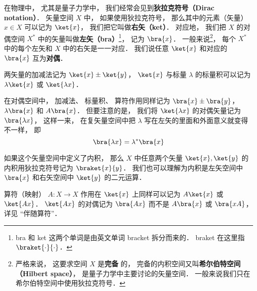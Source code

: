 

在物理中， 尤其是量子力学中， 我们经常会见到\textbf{狄拉克符号（Dirac notation）}． 矢量空间 $X$ 中， 如果使用狄拉克符号， 那么其中的元素（矢量） $x\in X$ 可以记为 $\ket{x}$， 我们把它叫做\textbf{右矢（ket）}． 对应地， 我们把 $X$ 的对偶空间 $X^*$ 中的矢量叫做\textbf{左矢（bra）}\footnote{bra 和 ket 这两个单词是由英文单词 bracket 拆分而来的． braket 在这里指 $\braket{\cdot}{\cdot}$．}， 记为 $\bra{x}$． 一般来说\footnote{严格来说， 这要求空间 $X$ 是\textbf{完备}%
的， 完备的内积空间又叫\textbf{希尔伯特空间（Hilbert space）}， 是量子力学中主要讨论的矢量空间． 一般来说我们只在希尔伯特空间中使用狄拉克符号．}， 每个 $X^*$ 中的每个左矢和 $X$ 中的右矢是一一对应． 我们说任意 $\ket{x}$ 和对应的 $\bra{x}$ 互为\textbf{对偶}．

两矢量的加减法记为 $\ket{x} \pm \ket{y}$， $\ket{x}$ 与标量 $\lambda$ 的标量积可以记为 $\lambda\ket{x}$ 或 $\ket{\lambda x}$．

在对偶空间中， 加减法、 标量积、 算符作用同样记为 $\bra{x} \pm \bra{y}$， $\lambda\bra{x}$ 和 $A\bra{x}$． 但要注意的是， 我们将 $\ket{\lambda x}$ 的对偶矢量记为 $\bra{\lambda x}$， 这样一来， 在复矢量空间中把 $\lambda$ 写在左矢的里面和外面意义就变得不一样， 即 %
\begin{equation}
\bra{\lambda x} = \lambda^* \bra{x}
\end{equation}

如果这个矢量空间中定义了内积， 那么 $X$ 中任意两个矢量 $\ket{x}, \ket{y}$ 的内积用狄拉克符号记为 $\braket{x}{y}$． 我们也可以理解为内积是左矢空间中 $\bra{x}$ 和右矢空间中 $\ket{y}$ 的二元运算．

算符（映射） $A:X\to X$ 作用在 $\ket{x}$ 上同样可以记为 $A\ket{x}$ 或 $\ket{Ax}$． $\ket{Ax}$ 的对偶记为 $\bra{Ax}$ 而不是 $A\bra{x}$ 或 $\bra{xA}$， 详见 “伴随算符”．
